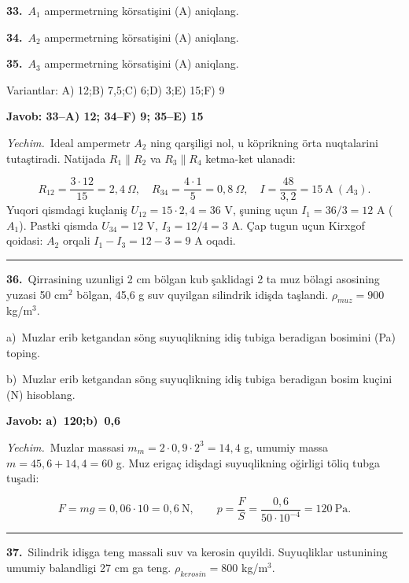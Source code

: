 \documentclass[11pt,a4paper]{article}
\begin{document}
\noindent\textbf{33.}\ $A_1$ ampermetrning körsatişini (A) aniqlang.\par
\noindent\textbf{34.}\ $A_2$ ampermetrning körsatişini (A) aniqlang.\par
\noindent\textbf{35.}\ $A_3$ ampermetrning körsatişini (A) aniqlang.\par
\noindent Variantlar: A) 12;\quad B) 7,5;\quad C) 6;\quad D) 3;\quad E) 15;\quad F) 9\par\smallskip
\noindent\colorbox{gray!12}{\parbox{\dimexpr\linewidth-2\fboxsep}{\textbf{Javob: 33--A) 12; 34--F) 9; 35--E) 15}}}\par\smallskip
\noindent\textit{Yechim.}\ Ideal ampermetr $A_2$ ning qarşiligi nol, u köprikning örta nuqtalarini tutaştiradi. Natijada $R_1\parallel R_2$ va $R_3\parallel R_4$ ketma-ket ulanadi:\par
\[R_{12}=\frac{3\cdot12}{15}=2{,}4\ \Omega,\quad R_{34}=\frac{4\cdot1}{5}=0{,}8\ \Omega,\quad I=\frac{48}{3{,}2}=15\ \text{A}\ (A_3).\]
Yuqori qismdagi kuçlaniş $U_{12}=15\cdot2{,}4=36$ V, şuning uçun $I_1=36/3=12$ A ($A_1$). Pastki qismda $U_{34}=12$ V, $I_3=12/4=3$ A. Çap tugun uçun Kirxgof qoidasi: $A_2$ orqali $I_1-I_3=12-3=9$ A oqadi.\par\par\medskip\hrule\medskip
{}\noindent\textbf{36.}\ Qirrasining uzunligi 2 cm bölgan kub şaklidagi 2 ta muz bölagi asosining yuzasi 50 cm$^2$ bölgan, 45,6 g suv quyilgan silindrik idişda taşlandi. $\rho_{muz}=900$ kg/m$^3$.\par
\noindent\hspace*{4mm}a)\ Muzlar erib ketgandan söng suyuqlikning idiş tubiga beradigan bosimini (Pa) toping.\par
\noindent\hspace*{4mm}b)\ Muzlar erib ketgandan söng suyuqlikning idiş tubiga beradigan bosim kuçini (N) hisoblang.\par
\noindent\colorbox{gray!12}{\parbox{\dimexpr\linewidth-2\fboxsep}{\textbf{Javob: a)\ 120;\quad b)\ 0,6}}}\par\smallskip
\noindent\textit{Yechim.}\ Muzlar massasi $m_m=2\cdot0{,}9\cdot2^3=14{,}4$ g, umumiy massa $m=45{,}6+14{,}4=60$ g. Muz erigaç idişdagi suyuqlikning oğirligi töliq tubga tuşadi:\par
\[F=mg=0{,}06\cdot10=0{,}6\ \text{N},\qquad p=\frac{F}{S}=\frac{0{,}6}{50\cdot10^{-4}}=120\ \text{Pa}.\]\par\medskip\hrule\medskip
{}\noindent\textbf{37.}\ Silindrik idişga teng massali suv va kerosin quyildi. Suyuqliklar ustunining umumiy balandligi 27 cm ga teng. $\rho_{kerosin}=800$ kg/m$^3$.\par
\end{document}
